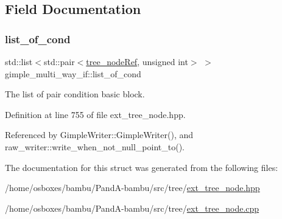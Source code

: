 \subsection{Field Documentation}
\mbox{\label{structgimple__multi__way__if_a453a071b56fd6f7f47c449e7f87a725e}} 
\subsubsection{\texorpdfstring{list\+\_\+of\+\_\+cond}{list\_of\_cond}}
{\footnotesize\ttfamily std\+::list$<$std\+::pair$<$\hyperlink{tree__node_8hpp_a6ee377554d1c4871ad66a337eaa67fd5}{tree\+\_\+node\+Ref}, unsigned int$>$ $>$ gimple\+\_\+multi\+\_\+way\+\_\+if\+::list\+\_\+of\+\_\+cond}



The list of pair condition basic block. 



Definition at line 755 of file ext\+\_\+tree\+\_\+node.\+hpp.



Referenced by Gimple\+Writer\+::\+Gimple\+Writer(), and raw\+\_\+writer\+::write\+\_\+when\+\_\+not\+\_\+null\+\_\+point\+\_\+to().



The documentation for this struct was generated from the following files\+:\begin{DoxyCompactItemize}
\item 
/home/osboxes/bambu/\+Pand\+A-\/bambu/src/tree/\hyperlink{ext__tree__node_8hpp}{ext\+\_\+tree\+\_\+node.\+hpp}\item 
/home/osboxes/bambu/\+Pand\+A-\/bambu/src/tree/\hyperlink{ext__tree__node_8cpp}{ext\+\_\+tree\+\_\+node.\+cpp}\end{DoxyCompactItemize}
